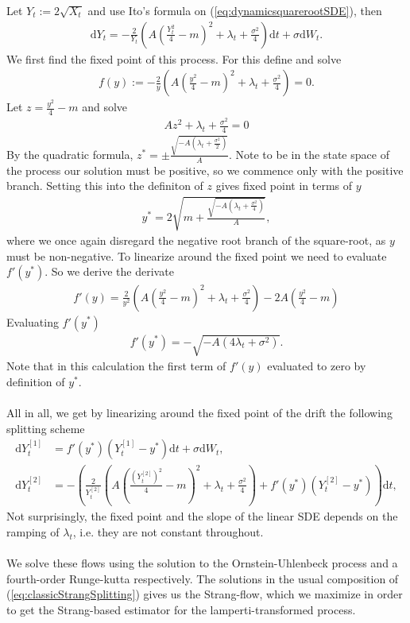 Let $Y_t:= 2\sqrt{X_t}$ and use Ito's formula on (\ref{eq:dynamicsquarerootSDE}), then
\begin{align}
    \mathrm{d}Y_t = - \frac{2}{Y_t}\left(A\left(\frac{Y_t^2}{4} - m\right)^2 + \lambda_t + \frac{\sigma^2}{4}\right)\mathrm{d}t + \sigma \mathrm{d}W_t. \label{eq:lampertiTransformedDynamicSquareroot}
\end{align}
We first find the fixed point of this process. For this define and solve
\begin{align}
    f(y) := -\frac{2}{y}\left(A\left(\frac{y^2}{4}-m\right)^2 + \lambda_t + \frac{\sigma^2}{4}\right) = 0.
\end{align}
Let $z = \frac{y^2}{4}-m$ and solve
\begin{align}
    Az^2 + \lambda_t + \frac{\sigma^2}{4} = 0
\end{align}
By the quadratic formula, $z^* = \pm\frac{\sqrt{-A\left(\lambda_t + \frac{\sigma^2}{2}\right)}}{A}$. Note to be in the state space of the process our solution must be positive, so we commence only with the positive branch. Setting this into the definiton of $z$ gives fixed point in terms of $y$
\begin{align}
    y^* = 2\sqrt{m + \frac{\sqrt{-A\left(\lambda_t + \frac{\sigma^2}{4}\right)}}{A}},
\end{align}
where we once again disregard the negative root branch of the square-root, as $y$ must be non-negative. To linearize around the fixed point we need to evaluate $f'(y^*)$. So we derive the derivate
\begin{align}
    f'(y) = \frac{2}{y^2}\left(A\left(\frac{y^2}{4}-m\right)^2 + \lambda_t + \frac{\sigma^2}{4}\right) - 2A\left(\frac{y^2}{4} - m\right)
\end{align}
Evaluating $f'(y^*)$
\begin{align}
    f'(y^*) = -\sqrt{-A\left(4\lambda_t + \sigma^2\right)}.
\end{align}
Note that in this calculation the first term of $f'(y)$ evaluated to zero by definition of $y^*$.\\\\
All in all, we get by linearizing around the fixed point of the drift the following splitting scheme
\begin{align}
    \mathrm{d}Y_t^{[1]} &= f'(y^*)\left(Y_t^{[1]} - y^*\right)\mathrm{d}t + \sigma \mathrm{d}W_t, \label{eq:lampertiSquarerootSplitting1}\\
    \mathrm{d}Y_t^{[2]} &= - \left(\frac{2}{Y_t^{[2]}}\left(A\left(\frac{\left(Y_t^{[2]}\right)^2}{4} - m\right)^2 + \lambda_t + \frac{\sigma^2}{4}\right) + f'(y^*)\left(Y_t^{[2]} - y^*\right)\right)\mathrm{d}t,
\end{align}
Not surprisingly, the fixed point and the slope of the linear SDE depends on the ramping of $\lambda_t$, i.e. they are not constant throughout. \\\\
We solve these flows using the solution to the Ornstein-Uhlenbeck process and a fourth-order Runge-kutta respectively. The solutions in the usual composition of (\ref{eq:classicStrangSplitting}) gives us the Strang-flow, which we maximize in order to get the Strang-based estimator for the lamperti-transformed process.
\newpage
